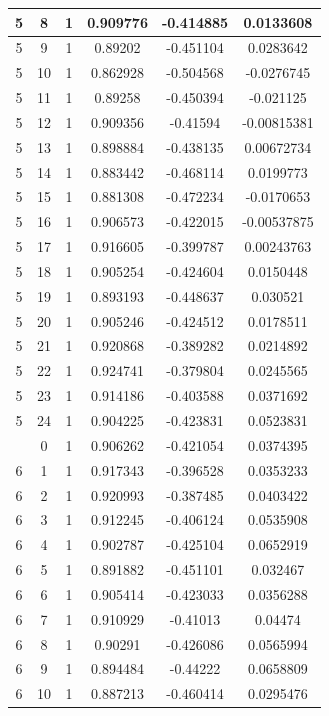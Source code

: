 \documentclass[12pt,a4paper]{article}
\numberwithin{equation}{section}
\numberwithin{figure}{section}
\numberwithin{table}{section}
\begin{document}
\begin{longtable}{|c|c|c|c|c|c|}
5 & 8 & 1 & 0.909776 & -0.414885 & 0.0133608 \\ \hline
5 & 9 & 1 & 0.89202 & -0.451104 & 0.0283642 \\ \hline
5 & 10 & 1 & 0.862928 & -0.504568 & -0.0276745 \\ \hline
5 & 11 & 1 & 0.89258 & -0.450394 & -0.021125 \\ \hline
5 & 12 & 1 & 0.909356 & -0.41594 & -0.00815381 \\ \hline
5 & 13 & 1 & 0.898884 & -0.438135 & 0.00672734 \\ \hline
5 & 14 & 1 & 0.883442 & -0.468114 & 0.0199773 \\ \hline
5 & 15 & 1 & 0.881308 & -0.472234 & -0.0170653 \\ \hline
5 & 16 & 1 & 0.906573 & -0.422015 & -0.00537875 \\ \hline
5 & 17 & 1 & 0.916605 & -0.399787 & 0.00243763 \\ \hline
5 & 18 & 1 & 0.905254 & -0.424604 & 0.0150448 \\ \hline
5 & 19 & 1 & 0.893193 & -0.448637 & 0.030521 \\ \hline
5 & 20 & 1 & 0.905246 & -0.424512 & 0.0178511 \\ \hline
5 & 21 & 1 & 0.920868 & -0.389282 & 0.0214892 \\ \hline
5 & 22 & 1 & 0.924741 & -0.379804 & 0.0245565 \\ \hline
5 & 23 & 1 & 0.914186 & -0.403588 & 0.0371692 \\ \hline
5 & 24 & 1 & 0.904225 & -0.423831 & 0.0523831 \\ \hline
\pagebreak
6 & 0 & 1 & 0.906262 & -0.421054 & 0.0374395 \\ \hline
6 & 1 & 1 & 0.917343 & -0.396528 & 0.0353233 \\ \hline
6 & 2 & 1 & 0.920993 & -0.387485 & 0.0403422 \\ \hline
6 & 3 & 1 & 0.912245 & -0.406124 & 0.0535908 \\ \hline
6 & 4 & 1 & 0.902787 & -0.425104 & 0.0652919 \\ \hline
6 & 5 & 1 & 0.891882 & -0.451101 & 0.032467 \\ \hline
6 & 6 & 1 & 0.905414 & -0.423033 & 0.0356288 \\ \hline
6 & 7 & 1 & 0.910929 & -0.41013 & 0.04474 \\ \hline
6 & 8 & 1 & 0.90291 & -0.426086 & 0.0565994 \\ \hline
6 & 9 & 1 & 0.894484 & -0.44222 & 0.0658809 \\ \hline
6 & 10 & 1 & 0.887213 & -0.460414 & 0.0295476 \\ \hline

\end{longtable}
\end{document}
